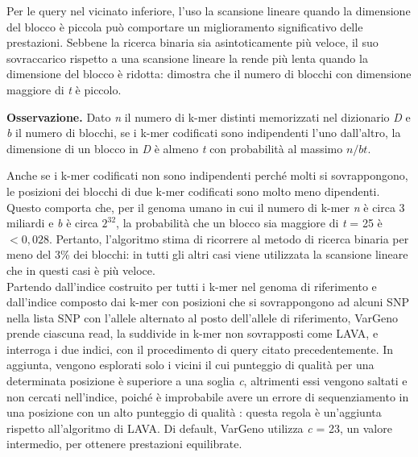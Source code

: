 \documentclass[../main.tex]{subfiles}
\begin{document}
Per le query nel vicinato inferiore, l'uso la scansione lineare quando la dimensione del blocco è piccola può comportare un miglioramento significativo delle prestazioni. Sebbene la ricerca binaria sia asintoticamente più veloce, il suo sovraccarico rispetto a una scansione lineare la rende più lenta quando la dimensione del blocco è ridotta: \cite{sun-medvedev2018vargeno} dimostra che il numero di blocchi con dimensione maggiore di \textit{t} è piccolo. 

\textbf{Osservazione.} Dato \textit{n} il numero di k-mer distinti memorizzati nel dizionario \textit{D} e \textit{b} il numero di blocchi, se i k-mer codificati sono indipendenti l'uno dall'altro, la dimensione di un blocco in \textit{D} è almeno \textit{t} con probabilità al massimo $n/bt$. 

Anche se i k-mer codificati non sono indipendenti perché molti si sovrappongono, le posizioni dei blocchi di due k-mer codificati sono molto meno dipendenti.  Questo comporta che, per il genoma umano in cui il numero di k-mer \textit{n} è circa 3 miliardi e \textit{b} è circa $2^{32}$, la probabilità che un blocco sia maggiore di \textit{t} = 25 è $<0,028$. Pertanto, l'algoritmo stima di ricorrere al metodo di ricerca binaria per meno del 3\% dei blocchi: in tutti gli altri casi viene utilizzata la scansione lineare che in questi casi è più veloce.\\

\noindent
Partendo dall'indice costruito per tutti i k-mer nel genoma di riferimento e dall'indice composto dai k-mer con posizioni che si sovrappongono ad alcuni SNP nella lista SNP con l'allele alternato al posto dell'allele di riferimento, VarGeno prende ciascuna read, la suddivide in k-mer non sovrapposti come LAVA, e interroga i due indici, con il procedimento di query citato precedentemente. In aggiunta, vengono esplorati solo i vicini il cui punteggio di qualità per una determinata posizione è superiore a una soglia \textit{c}, altrimenti essi vengono saltati e non cercati nell'indice, poiché è improbabile avere un errore di sequenziamento in una posizione con un alto punteggio di qualità \cite{sun-medvedev2018vargeno}: questa regola è un'aggiunta rispetto all'algoritmo di LAVA. Di default, VarGeno utilizza \textit{c} = 23, un valore intermedio, per ottenere prestazioni equilibrate.
\end{document}
